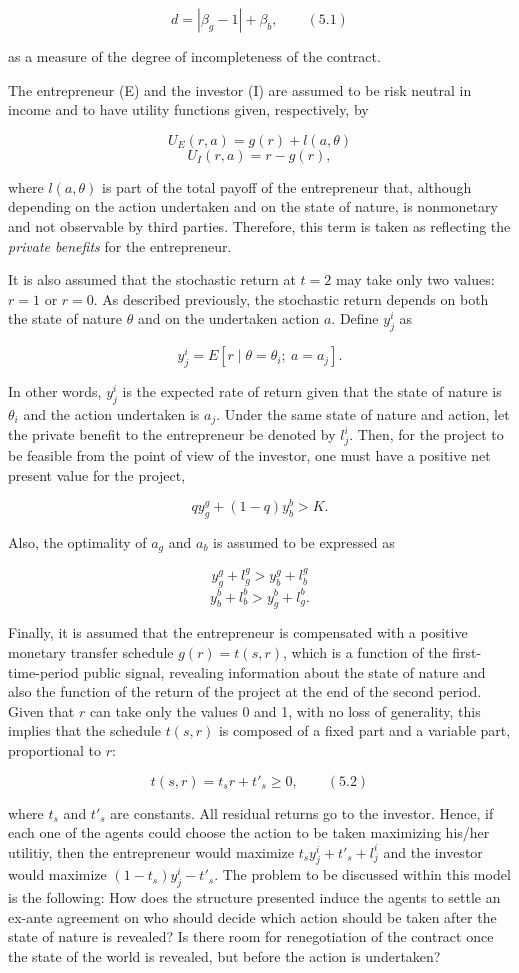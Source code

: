 \documentclass[11pt,a4paper]{article}
\begin{document}
\[d = |\beta_g - 1| + \beta_b, \qquad (5.1)\]

as a measure of the degree of incompleteness of the contract.

The entrepreneur (E) and the investor (I) are assumed to be risk neutral in income and to have
utility functions given, respectively, by

\[U_E(r, a) = g(r) + l(a, \theta)\] \[U_I(r, a) = r - g(r),\]

where \(l(a, \theta)\) is part of the total payoff of the entrepreneur that, although depending on
the action undertaken and on the state of nature, is nonmonetary and not observable by third
parties. Therefore, this term is taken as reflecting the \emph{private benefits} for the
entrepreneur.

It is also assumed that the stochastic return at \(t = 2\) may take only two values: \(r = 1\) or
\(r = 0\). As described previously, the stochastic return depends on both the state of nature
\(\theta\) and on the undertaken action \(a\). Define \(y^i_j\) as

\[y^i_j = E\left[r \mid \theta = \theta_i;\ a = a_j\right].\]

In other words, \(y^i_j\) is the expected rate of return given that the state of nature is
\(\theta_i\) and the action undertaken is \(a_j\). Under the same state of nature and action, let
the private benefit to the entrepreneur be denoted by \(l^i_j\). Then, for the project to be
feasible from the point of view of the investor, one must have a positive net present value for the
project,

\[q y^g_g + (1 - q) y^b_b > K.\]

Also, the optimality of \(a_g\) and \(a_b\) is assumed to be expressed as

\[y^g_g + l^g_g > y^g_b + l^g_b\] \[y^b_b + l^b_b > y^b_g + l^b_g.\]

Finally, it is assumed that the entrepreneur is compensated with a positive monetary transfer
schedule \(g(r) = t(s, r)\), which is a function of the first-time-period public signal, revealing
information about the state of nature and also the function of the return of the project at the end
of the second period. Given that \(r\) can take only the values 0 and 1, with no loss of generality,
this implies that the schedule \(t(s, r)\) is composed of a fixed part and a variable part,
proportional to \(r\):

\[t(s, r) = t_s r + t'_s \geq 0, \qquad (5.2)\]

where \(t_s\) and \(t'_s\) are constants. All residual returns go to the investor. Hence, if each
one of the agents could choose the action to be taken maximizing his/her utilitiy, then the
entrepreneur would maximize \(t_s y^i_j + t'_s + l^i_j\) and the investor would maximize
\((1 - t_s) y^i_j - t'_s\). The problem to be discussed within this model is the following: How does
the structure presented induce the agents to settle an ex-ante agreement on who should decide which
action should be taken after the state of nature is revealed? Is there room for renegotiation of the
contract once the state of the world is revealed, but before the action is undertaken?
\end{document}
